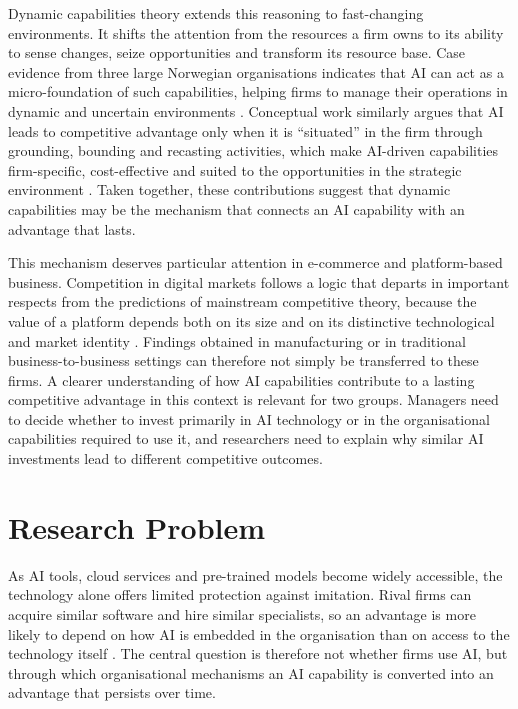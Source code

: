 Dynamic capabilities theory extends this reasoning to fast-changing environments. It shifts the attention from the resources a firm owns to its ability to sense changes, seize opportunities and transform its resource base. Case evidence from three large Norwegian organisations indicates that AI can act as a micro-foundation of such capabilities, helping firms to manage their operations in dynamic and uncertain environments \parencite{mikalef2021b2b}. Conceptual work similarly argues that AI leads to competitive advantage only when it is \enquote{situated} in the firm through grounding, bounding and recasting activities, which make AI-driven capabilities firm-specific, cost-effective and suited to the opportunities in the strategic environment \parencite{kemp2024}. Taken together, these contributions suggest that dynamic capabilities may be the mechanism that connects an AI capability with an advantage that lasts.

This mechanism deserves particular attention in e-commerce and platform-based business. Competition in digital markets follows a logic that departs in important respects from the predictions of mainstream competitive theory, because the value of a platform depends both on its size and on its distinctive technological and market identity \parencite{cennamo2021}. Findings obtained in manufacturing or in traditional business-to-business settings can therefore not simply be transferred to these firms. A clearer understanding of how AI capabilities contribute to a lasting competitive advantage in this context is relevant for two groups. Managers need to decide whether to invest primarily in AI technology or in the organisational capabilities required to use it, and researchers need to explain why similar AI investments lead to different competitive outcomes.

\section{Research Problem}
\label{sec:problem}

As AI tools, cloud services and pre-trained models become widely accessible, the technology alone offers limited protection against imitation. Rival firms can acquire similar software and hire similar specialists, so an advantage is more likely to depend on how AI is embedded in the organisation than on access to the technology itself \parencite{kemp2024, krakowski2023}. The central question is therefore not whether firms use AI, but through which organisational mechanisms an AI capability is converted into an advantage that persists over time.


